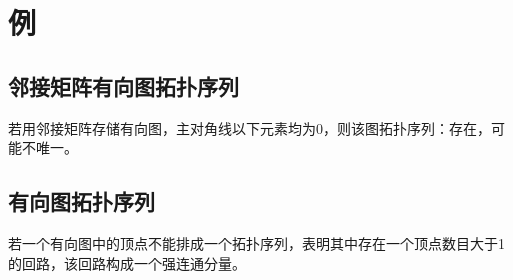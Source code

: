 \section{例}

\subsection{邻接矩阵有向图拓扑序列}
若用邻接矩阵存储有向图，主对角线以下元素均为0，则该图拓扑序列：存在，可能不唯一。


\subsection{有向图拓扑序列}
若一个有向图中的顶点不能排成一个拓扑序列，表明其中存在一个顶点数目大于1的回路，该回路构成一个强连通分量。

